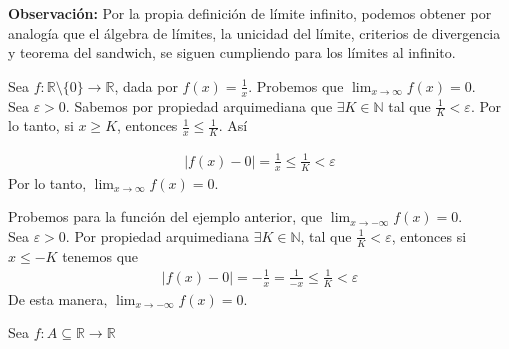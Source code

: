 \documentclass[12pt]{book}
\begin{document}
\textbf{Observación:} Por la propia definición de límite infinito, podemos obtener por analogía que el álgebra de límites, la unicidad del límite, criterios de divergencia y teorema del sandwich, se siguen cumpliendo para los límites al infinito.

\begin{eje}{}{}
    Sea $f: \mathbb{R}\setminus\{0\} \to \mathbb{R}$, dada por $\displaystyle f(x)=\frac{1}{x}$. Probemos que $\displaystyle \lim_{x\to \infty}f(x)=0$.\\

    Sea $\varepsilon>0$. Sabemos por propiedad arquimediana que $\exists K \in \mathbb{N}$ tal que $\displaystyle \frac{1}{K}<\varepsilon$. Por lo tanto, si $x\geq K$, entonces $\displaystyle \frac{1}{x}\leq \frac{1}{K}$. Así

    \begin{align*}
        |f(x)-0|=\frac{1}{x}\leq \frac{1}{K}<\varepsilon
    \end{align*}
    Por lo tanto, $\displaystyle \lim_{x\to \infty}f(x)=0$.
\end{eje}

\begin{eje}{}{}
    Probemos para la función del ejemplo anterior, que $\displaystyle \lim_{x\to -\infty}f(x)=0$. \\

    Sea $\varepsilon>0$. Por propiedad arquimediana $\exists K \in \mathbb{N}$, tal que $\displaystyle \frac{1}{K}<\varepsilon$, entonces si $x \leq -K$ tenemos que 
    \begin{align*}
        |f(x)-0|=-\frac{1}{x}=\frac{1}{-x}\leq \frac{1}{K}<\varepsilon
    \end{align*}
    De esta manera, $\displaystyle \lim_{x\to -\infty}f(x)=0$.
\end{eje}

\begin{teo}{}{}
    Sea $f:A \subseteq\mathbb{R} \to \mathbb{R}$
\end{teo}
\end{document}
